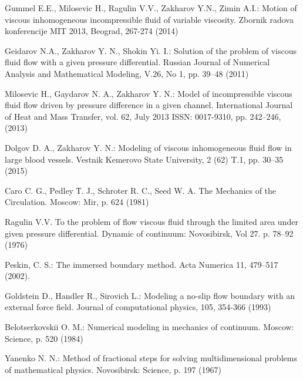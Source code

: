 \documentclass[runningheads,a4paper]{llncs}
\begin{document}
\begin{thebibliography}{4}
 Gummel E.E., Milosevic H., Ragulin V.V., Zakharov Y.N., Zimin A.I.: Motion of viscous inhomogeneous incompressible fluid of variable viscosity. Zbornik radova konferencije MIT 2013, Beograd, 267-274 (2014)

 Geidarov N.A., Zakharov Y. N.,  Shokin Yi. I.: Solution of the problem of viscous fluid flow with a given pressure differential. Russian Journal of Numerical Analysis and Mathematical Modeling, V.26, No 1, pp. 39--48 (2011)

 Milosevic H., Gaydarov N. A., Zakharov Y. N.: Model of incompressible viscous fluid flow driven by  pressure difference in a given channel. International Journal of Heat and Mass Transfer, vol. 62, July 2013 ISSN: 0017-9310, pp. 242--246, (2013)

 Dolgov D. A., Zakharov Y. N.: Modeling of viscous inhomogeneous fluid flow in large blood vessels. Vestnik Kemerovo State University, 2 (62) T.1, pp. 30--35 (2015)

 Caro C. G., Pedley Т. J., Schroter R. C., Seed W. A. The Mechanics of the Circulation. Moscow: Mir, p. 624 (1981)

 Ragulin V.V. To the problem of flow viscous fluid through the limited area under given pressure differential. Dynamic of continuum: Novosibirsk, Vol 27. p. 78--92 (1976)

 Peskin, C. S.: The immersed boundary method. Acta Numerica 11, 479–517 (2002).

 Goldstein D., Handler R., Sirovich L.: Modeling a no-slip flow boundary with an external force field. Journal of computational physics, 105, 354-366 (1993)

 Belotserkovskii O. M.: Numerical modeling in mechanics of continuum. Moscow: Science, p. 520 (1984)

 Yanenko N. N.: Method of fractional steps for solving multidimensional problems of mathematical physics. Novosibirsk: Science, p. 197 (1967)

\end{thebibliography}
\end{document}
